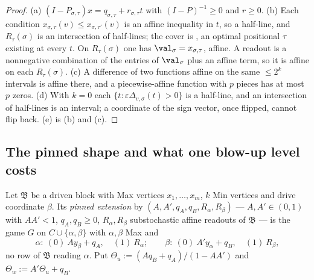 \begin{proof}
(a) $(I-P_{\sigma,\tau})x=q_{\sigma,\tau}+r_{\sigma,\tau}t$ with
$(I-P)^{-1}\ge0$ and $r\ge0$.
(b) Each condition $x_{\sigma,\tau}(v)\le x_{\sigma,\tau'}(v)$ is an affine
inequality in $t$, so a half-line, and $R_\tau(\sigma)$ is an intersection of
half-lines; the cover is , an optimal
positional $\tau$ existing at every $t$. On $R_\tau(\sigma)$ one has
$\val_\sigma=x_{\sigma,\tau}$, affine. A readout is a nonnegative combination
of the entries of $\val_\sigma$ plus an affine term, so it is affine on each
$R_\tau(\sigma)$.
(c) A difference of two functions affine on the same $\le2^{k}$ intervals is
affine there, and a piecewise-affine function with $p$ pieces has at most $p$
zeros. (d) With $k=0$ each $\{t:\varepsilon\Delta_{v,\sigma}(t)>0\}$ is a
half-line, and an intersection of half-lines is an interval; a coordinate of
the sign vector, once flipped, cannot flip back. (e) is (b) and (c).
\end{proof}

\subsection{The pinned shape and what one blow-up level costs}\label{rs:sec-level}

\begin{definition}\label{rs:def-pinned}
Let $\mathfrak B$ be a driven block with Max vertices $x_1,\dots,x_m$, $k$ Min
vertices and drive coordinate $\beta$. Its \emph{pinned extension} by
$(A,A',q_A,q_B,R_\alpha,R_\beta)$ --- $A,A'\in(0,1)$ with $AA'<1$, $q_A,q_B\ge0$,
$R_\alpha,R_\beta$ substochastic affine readouts of $\mathfrak B$ --- is the
game $G$ on $C\cup\{\alpha,\beta\}$ with $\alpha,\beta$ Max and
\[
 \alpha:\ (0)\ Ay_\beta+q_A,\quad(1)\ R_\alpha;\qquad
 \beta:\ (0)\ A'y_\alpha+q_B,\quad(1)\ R_\beta,
\]
no row of $\mathfrak B$ reading $\alpha$. Put
$\Theta_u:=(Aq_B+q_A)/(1-AA')$ and $\Theta_w:=A'\Theta_u+q_B$.
\end{definition}


